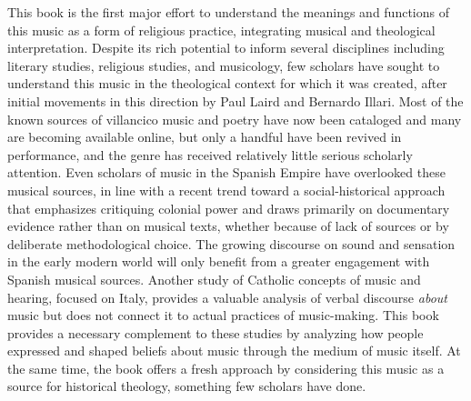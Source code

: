 This book is the first major effort to understand the meanings and functions of
this music as a form of religious practice, integrating musical and theological
interpretation.
Despite its rich potential to inform several disciplines including literary
studies, religious studies, and musicology, few scholars have sought to
understand this music in the theological context for which it was created,
after initial movements in this direction by Paul Laird and Bernardo Illari.%
    \Autocites
    {Laird:VC}
    {Illari:Polychoral}
Most of the known sources of villancico music and poetry have now been
cataloged and many are becoming available online, but only a handful have been
revived in performance, and the genre has received relatively little serious
scholarly attention.%
    \Autocites
    [Catalogs of villancico poetry imprints:][]{BNE:VCs17C}
    {BNE:VCs18C}
    {UK:VCs}
    {US:VCs}
    {Codina:MontserratVCs}
    [selected catalogs of collections including villancico 
    music manuscripts:][]{Pedrell:BNC}
    {Stanford:Catalog}
    {Tello:SanchezGarzaCatalogo}
    {LopezCalo:Segovia}
    {Bonastre:CanetCatalog}
    {Ezquerro:CatalogoZaragoza}
    {Stevenson:Sources}
Even scholars of music in the Spanish Empire have overlooked these musical
sources, in line with a recent trend toward a social-historical approach that
emphasizes critiquing colonial power and draws primarily on documentary
evidence rather than on musical texts, whether because of lack of sources or
by deliberate methodological choice.%
    \Autocites
    {Tomlinson:SingingNewWorld}
    {Baker:Harmony}
    {Irving:Colonial}
    {RamosKittrell:PlayingCathedral}
The growing discourse on sound and sensation in the early modern world will
only benefit from a greater engagement with Spanish musical sources.%
    \Autocites
    {FilippiNoone:ListeningCatholicism}
    {Rath:EarlyAmerica}
    {Ochoa:Aurality}
    {Dean:ListeningPolyphony}
    {Gouk:MusicScienceMagic}
    {Gouk:Harmonics}
    {Gouk:Sciences}
    {Gouk:RepresentingEmotions}
    {Tomlinson:Magic}
    {Austern:Nature}
    {Daston:Wonders}
    {Feldman:Passions}
    {Wagstaff:Processions}
Another study of Catholic concepts of music and hearing, focused on Italy,
provides a valuable analysis of verbal discourse \emph{about} music but does
not connect it to actual practices of music-making.%
    \Autocite{DellAntonio:Listening}
This book provides a necessary complement to these studies by analyzing how
people expressed and shaped beliefs about music through the medium of music
itself.
At the same time, the book offers a fresh approach by considering this music as
a source for historical theology, something few scholars have done.


